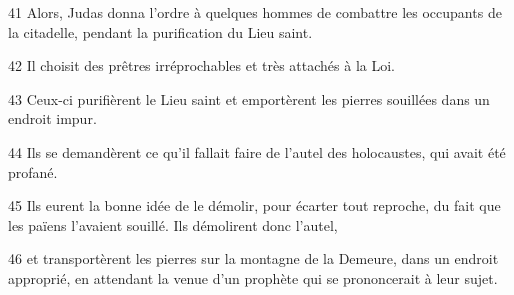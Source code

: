 
41 Alors, Judas donna l’ordre à quelques hommes de combattre les occupants de la citadelle, pendant la purification du Lieu saint.

42 Il choisit des prêtres irréprochables et très attachés à la Loi.

43 Ceux-ci purifièrent le Lieu saint et emportèrent les pierres souillées dans un endroit impur.

44 Ils se demandèrent ce qu’il fallait faire de l’autel des holocaustes, qui avait été profané.

45 Ils eurent la bonne idée de le démolir, pour écarter tout reproche, du fait que les païens l’avaient souillé. Ils démolirent donc l’autel,

46 et transportèrent les pierres sur la montagne de la Demeure, dans un endroit approprié, en attendant la venue d’un prophète qui se prononcerait à leur sujet.
